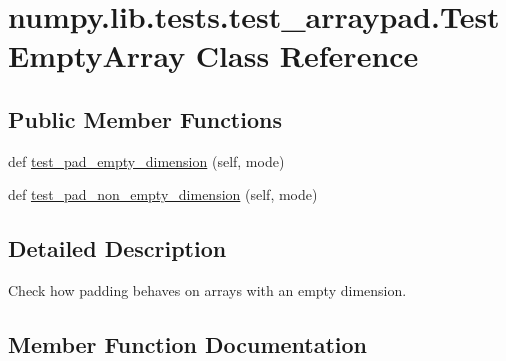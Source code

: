 \hypertarget{classnumpy_1_1lib_1_1tests_1_1test__arraypad_1_1TestEmptyArray}{}\section{numpy.\+lib.\+tests.\+test\+\_\+arraypad.\+Test\+Empty\+Array Class Reference}
\label{classnumpy_1_1lib_1_1tests_1_1test__arraypad_1_1TestEmptyArray}
\subsection*{Public Member Functions}
\begin{DoxyCompactItemize}
\item 
def \hyperlink{classnumpy_1_1lib_1_1tests_1_1test__arraypad_1_1TestEmptyArray_ad9b417bc81904c35f3964d49481d1bf4}{test\+\_\+pad\+\_\+empty\+\_\+dimension} (self, mode)
\item 
def \hyperlink{classnumpy_1_1lib_1_1tests_1_1test__arraypad_1_1TestEmptyArray_a58453a2c5df5ed64480fd28254a8d91a}{test\+\_\+pad\+\_\+non\+\_\+empty\+\_\+dimension} (self, mode)
\end{DoxyCompactItemize}


\subsection{Detailed Description}
\begin{DoxyVerb}Check how padding behaves on arrays with an empty dimension.\end{DoxyVerb}
 

\subsection{Member Function Documentation}
\mbox{\label{classnumpy_1_1lib_1_1tests_1_1test__arraypad_1_1TestEmptyArray_ad9b417bc81904c35f3964d49481d1bf4}} 
